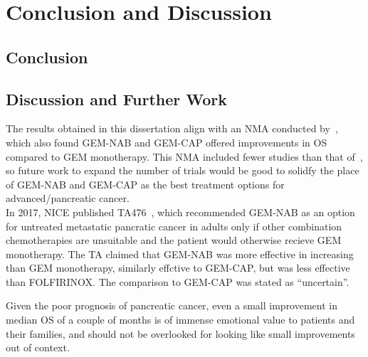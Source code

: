 \chapter{Conclusion and Discussion}\label{conclusions}

\section{Conclusion}

\section{Discussion and Further Work}
The results obtained in this dissertation align with an NMA conducted by~\cite{gresham2014}, which also found GEM-NAB and GEM-CAP offered improvements in OS compared to GEM monotherapy. This NMA included fewer studies than that of~\cite{gresham2014}, so future work to expand the number of trials would be good to solidfy the place of GEM-NAB and GEM-CAP as the best treatment options for advanced/pancreatic cancer. \\

In 2017, NICE published TA476~\cite{TA476}, which recommended GEM-NAB as an option for untreated metastatic pancratic cancer in adults only if other combination chemotherapies are unsuitable and the patient would otherwise recieve GEM monotherapy. The TA claimed that GEM-NAB was more effective in increasing than GEM monotherapy, similarly effctive to GEM-CAP, but was less effective than FOLFIRINOX. The comparison to GEM-CAP was stated as ``uncertain''.


Given the poor prognosis of pancreatic cancer, even a small improvement in median OS of a couple of months is of immense emotional value to patients and their families, and should not be overlooked for looking like small improvements out of context.